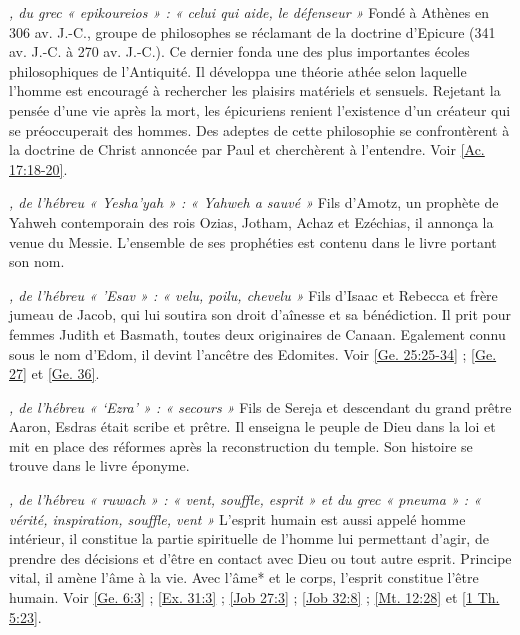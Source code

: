 \begin{multicols}{2}
\textit{, du grec « epikoureios » : « celui qui aide, le défenseur »}\newline
Fondé à Athènes en 306 av. J.-C., groupe de philosophes se réclamant de la doctrine d'Epicure (341 av. J.-C. à 270 av. J.-C.). Ce dernier fonda une des plus importantes écoles philosophiques de l'Antiquité. Il développa une théorie athée selon laquelle l'homme est encouragé à rechercher les plaisirs matériels et sensuels. Rejetant la pensée d'une vie après la mort, les épicuriens renient l'existence d'un créateur qui se préoccuperait des hommes. Des adeptes de cette philosophie se confrontèrent à la doctrine de Christ annoncée par Paul et cherchèrent à l'entendre. Voir \vref{Ac. 17:18-20}.

\textit{, de l'hébreu « Yesha'yah » : « Yahweh a sauvé »}\newline
Fils d'Amotz, un prophète de Yahweh contemporain des rois Ozias, Jotham, Achaz et Ezéchias, il annonça la venue du Messie. L'ensemble de ses prophéties est contenu dans le livre portant son nom.

\textit{, de l'hébreu « 'Esav » : « velu, poilu, chevelu »}\newline
Fils d'Isaac et Rebecca et frère jumeau de Jacob, qui lui soutira son droit d'aînesse et sa bénédiction. Il prit pour femmes Judith et Basmath, toutes deux originaires de Canaan. Egalement connu sous le nom d'Edom, il devint l'ancêtre des Edomites. Voir \vref{Ge. 25:25-34} ; \vref{Ge. 27} et \vref{Ge. 36}.

\textit{, de l'hébreu « `Ezra' » : « secours »}\newline
Fils de Sereja et descendant du grand prêtre Aaron, Esdras était scribe et prêtre. Il enseigna le peuple de Dieu dans la loi et mit en place des réformes après la reconstruction du temple. Son histoire se trouve dans le livre éponyme.

\textit{, de l'hébreu « ruwach » : « vent, souffle, esprit » et du grec « pneuma » : « vérité, inspiration, souffle, vent »}\newline
L'esprit humain est aussi appelé homme intérieur, il constitue la partie spirituelle de l'homme lui permettant d'agir, de prendre des décisions et d'être en contact avec Dieu ou tout autre esprit. Principe vital, il amène l'âme à la vie. Avec l'âme* et le corps, l'esprit constitue l'être humain. Voir \vref{Ge. 6:3} ; \vref{Ex. 31:3} ; \vref{Job 27:3} ; \vref{Job 32:8} ; \vref{Mt. 12:28} et \vref{1 Th. 5:23}.


\end{multicols}

